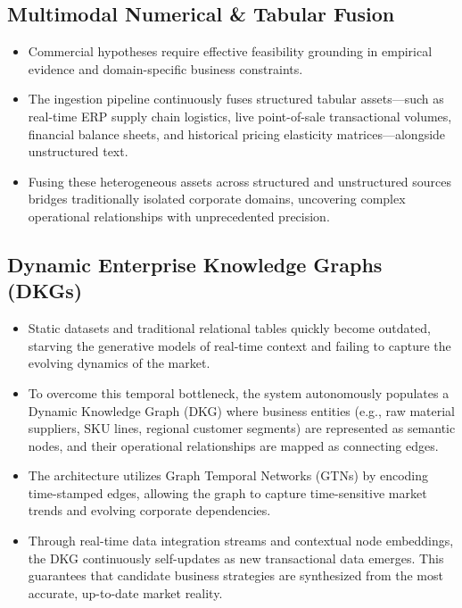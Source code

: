 \documentclass[11pt, a4paper]{article}
\begin{document}
\subsection{Multimodal Numerical \& Tabular Fusion}
\begin{itemize}[leftmargin=*]
    \item Commercial hypotheses require effective feasibility grounding in empirical evidence and domain-specific business constraints.
    
    \item The ingestion pipeline continuously fuses structured tabular assets---such as real-time ERP supply chain logistics, live point-of-sale transactional volumes, financial balance sheets, and historical pricing elasticity matrices---alongside unstructured text.
    
    \item Fusing these heterogeneous assets across structured and unstructured sources bridges traditionally isolated corporate domains, uncovering complex operational relationships with unprecedented precision.
\end{itemize}

\subsection{Dynamic Enterprise Knowledge Graphs (DKGs)}
\begin{itemize}[leftmargin=*]
    \item Static datasets and traditional relational tables quickly become outdated, starving the generative models of real-time context and failing to capture the evolving dynamics of the market.
    
    \item To overcome this temporal bottleneck, the system autonomously populates a Dynamic Knowledge Graph (DKG) where business entities (e.g., raw material suppliers, SKU lines, regional customer segments) are represented as semantic nodes, and their operational relationships are mapped as connecting edges.
    
    \item The architecture utilizes Graph Temporal Networks (GTNs) by encoding time-stamped edges, allowing the graph to capture time-sensitive market trends and evolving corporate dependencies.
    
    \item Through real-time data integration streams and contextual node embeddings, the DKG continuously self-updates as new transactional data emerges. This guarantees that candidate business strategies are synthesized from the most accurate, up-to-date market reality.
\end{itemize}
\end{document}
